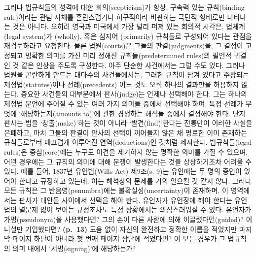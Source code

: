 그러나 법규칙들의 성격에 대한 회의(scepticism)가 항상, 구속력 있는
규칙(binding rule)이라는 관념 자체를 혼란스럽거나 허구적이라 비판하는
극단적 형태로만 나타나는 것은 아니다. 오히려 영국과 미국에서 가장 널리
퍼져 있는 회의적 시각은, 법체계(legal system)가 (wholly),
혹은 심지어 (primarily) 규칙들로 구성되어 있다는 관점을
재검토하라고 요청한다. 물론 법원(courts)은 그들의 판결(judgments)을, 그
결정이 고정되고 명확한 의미를 가진 미리 정해진 규칙들(predetermined
rules)의 필연적 귀결인 것 같은 인상을 주도록 구성한다. 아주 단순한
사건에서는 그럴 수도 있다. 그러나 법원을 곤란하게 만드는 대다수의
사건들에서는, 그러한 규칙이 담겨 있다고 주장되는 제정법(statutes)이나
선례(precedents) 어느 것도 오직 하나의 결과만을 허용하지 않는다. 중요한
사건들의 대부분에서 판사(judge)는 언제나 선택해야 한다. 그는 하나의
제정법 문언에 주어질 수 있는 여러 가지 의미들 중에서 선택해야 하며, 특정
선례가 무엇에 ‘해당하는지(amounts to)’에 관한 경쟁하는 해석들 중에서
결정해야 한다. 단지 판사는 법을 ‘창출(make)’하는 것이 아니라
‘발견(find)’한다는 전통만이 이러한 사실을 은폐하고, 마치 그들의 판결이
판사의 선택이 끼어들지 않은 채 명료한 이미 존재하는 규칙들로부터
매끄럽게 이루어진 연역(deductions)인 것처럼 제시한다. 법규칙들(legal
rules)은 중심(core)에는 누구도 이견을 제기하지 않는 명확한 의미를 가질
수 있으며, 어떤 경우에는 그 규칙의 의미에 대해 분쟁이 발생한다는 것을
상상하기조차 어려울 수 있다. 예를 들어, 1837년 유언법(Wills Act)
제9조(s. 9)는 유언에는 두 명의 증인이 있어야 한다고 규정하고 있는데,
이는 해석상의 문제를 거의 일으킬 것 같지 않다. 그러나 모든 규칙은 그
반음영(penumbra)에는 불확실성(uncertainty)이 존재하며, 이 영역에서는
판사가 대안들 사이에서 선택을 해야 한다. 유언자가 유언장에
해야 한다는 유언법의 별문제 없어 보이는 규정조차도 특정
상황에서는 의심스러워질 수 있다. 유언자가 가명(pseudonym)을 사용했다면?
그의 손이 다른 사람에 의해 이끌렸다면(guided)? 이니셜만 기입했다면?
\textbf{(p.~13)} 도움 없이 자신의 완전하고 정확한 이름을 적었지만 마지막
페이지 하단이 아니라 첫 번째 페이지 상단에 적었다면? 이 모든 경우가 그
법규칙의 의미 내에서 ‘서명(signing)’에 해당하는가?

